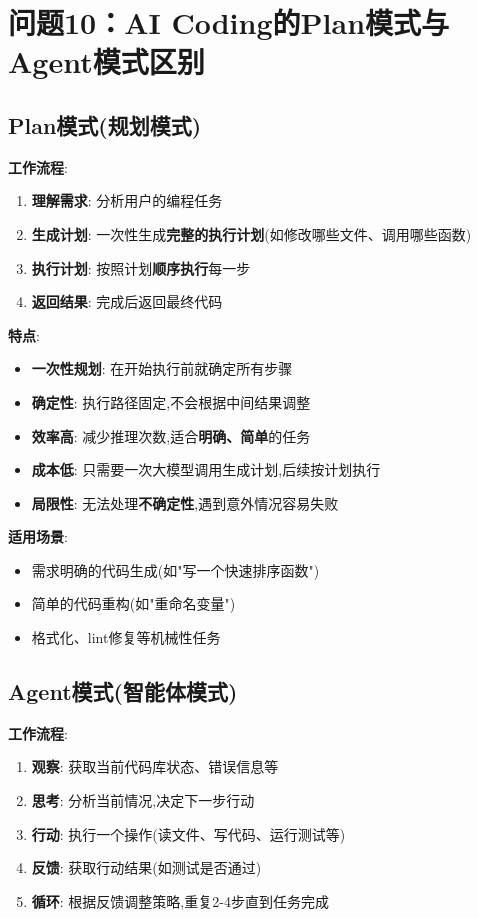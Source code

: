 \documentclass[UTF8]{ctexart}
\begin{document}
\section{问题10：AI Coding的Plan模式与Agent模式区别}

\subsection{Plan模式(规划模式)}

\textbf{工作流程}:
\begin{enumerate}
    \item \textbf{理解需求}: 分析用户的编程任务
    \item \textbf{生成计划}: 一次性生成\textbf{完整的执行计划}(如修改哪些文件、调用哪些函数)
    \item \textbf{执行计划}: 按照计划\textbf{顺序执行}每一步
    \item \textbf{返回结果}: 完成后返回最终代码
\end{enumerate}

\textbf{特点}:
\begin{itemize}
    \item \textbf{一次性规划}: 在开始执行前就确定所有步骤
    \item \textbf{确定性}: 执行路径固定,不会根据中间结果调整
    \item \textbf{效率高}: 减少推理次数,适合\textbf{明确、简单}的任务
    \item \textbf{成本低}: 只需要一次大模型调用生成计划,后续按计划执行
    \item \textbf{局限性}: 无法处理\textbf{不确定性},遇到意外情况容易失败
\end{itemize}

\textbf{适用场景}:
\begin{itemize}
    \item 需求明确的代码生成(如"写一个快速排序函数")
    \item 简单的代码重构(如"重命名变量")
    \item 格式化、lint修复等机械性任务
\end{itemize}

\subsection{Agent模式(智能体模式)}

\textbf{工作流程}:
\begin{enumerate}
    \item \textbf{观察}: 获取当前代码库状态、错误信息等
    \item \textbf{思考}: 分析当前情况,决定下一步行动
    \item \textbf{行动}: 执行一个操作(读文件、写代码、运行测试等)
    \item \textbf{反馈}: 获取行动结果(如测试是否通过)
    \item \textbf{循环}: 根据反馈调整策略,重复2-4步直到任务完成
\end{enumerate}
\end{document}
